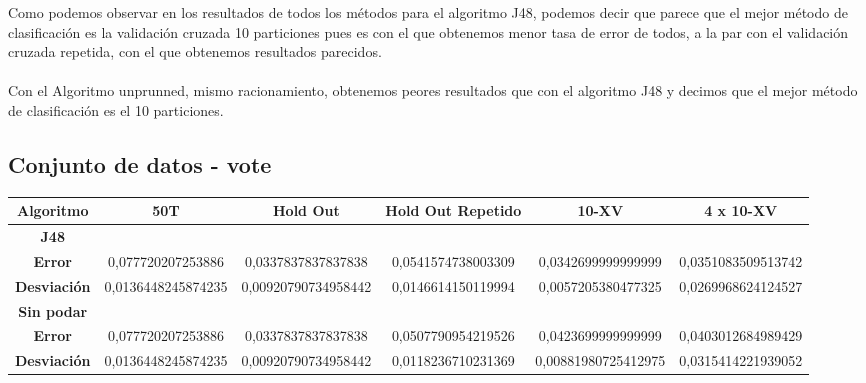\documentclass{article}
\begin{document}
Como podemos observar en los resultados de todos los métodos para el algoritmo J48, podemos decir que parece que el mejor método de clasificación es la validación cruzada 10 particiones pues es con el que obtenemos menor tasa de error de todos, a la par con el validación cruzada repetida, con el que obtenemos resultados parecidos.
\\
\\

Con el Algoritmo unprunned, mismo racionamiento, obtenemos peores resultados que con el algoritmo J48 y decimos que el mejor método de clasificación es el 10 particiones.

\vspace{1cm}

\subsection{Conjunto de datos - vote}
\begin{table}[h]
	\begin{adjustbox}{center}
		\begin{tabular}{|c|c|c|c|c|c|}
			\hline
			\rowcolor[gray]{0.8}
			\textbf{Algoritmo} & \textbf{50T} & \textbf{Hold
			 Out} & \textbf{Hold Out Repetido} & \textbf{10-XV} & \textbf{4 x 10-XV}\\ \hline
			 
			 \rowcolor[gray]{0.8}
			 \textbf{J48} & \multicolumn{5}{|c|}{ } \\ \hline
			 
			 \textbf{Error} & 0,077720207253886 & 0,0337837837837838 & 0,0541574738003309 & 0,0342699999999999 & 0,0351083509513742 \\ \hline
			 
			 \textbf{Desviación} & 0,0136448245874235 & 0,00920790734958442 & 0,0146614150119994 & 0,0057205380477325 & 0,0269968624124527 \\ \hline
			 
			 \rowcolor[gray]{0.8}
			 \textbf{Sin podar} & \multicolumn{5}{|c|}{ } \\ \hline
			 
			 \textbf{Error} & 0,077720207253886 & 0,0337837837837838 & 0,0507790954219526 & 0,0423699999999999 & 0,0403012684989429 \\ \hline
			 
			 \textbf{Desviación} & 0,0136448245874235 & 0,00920790734958442 & 0,0118236710231369 & 0,00881980725412975 & 0,0315414221939052 \\ \hline
		\end{tabular}
	\end{adjustbox}
\end{table}
\end{document}
